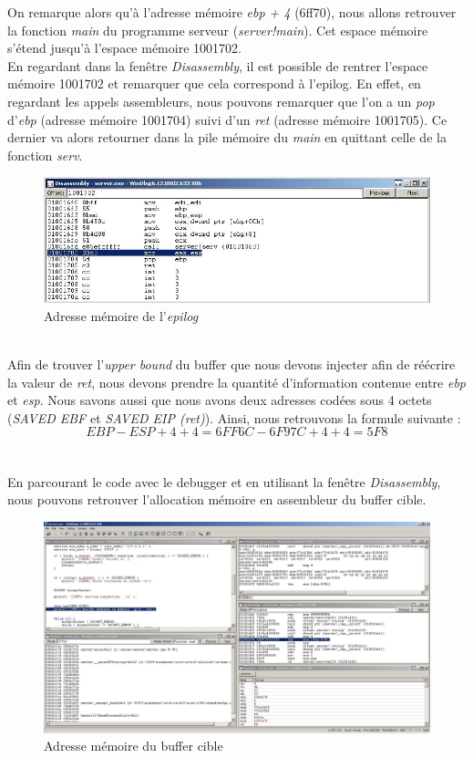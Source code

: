 On remarque alors qu'à l'adresse mémoire \textit{ebp + 4} (6ff70), nous allons retrouver la fonction \textit{main} du programme serveur (\textit{server!main}). Cet espace mémoire s'étend jusqu'à l'espace mémoire 1001702.\\
En regardant dans la fenêtre \textit{Disassembly}, il est possible de rentrer l'espace mémoire 1001702 et remarquer que cela correspond à l'epilog. En effet, en regardant les appels assembleurs, nous pouvons remarquer que l'on a un \textit{pop} d'\textit{ebp} (adresse mémoire 1001704) suivi d'un \textit{ret} (adresse mémoire 1001705). Ce dernier va alors retourner dans la pile mémoire du \textit{main} en quittant celle de la fonction \textit{serv}.
\begin{figure}[H]
 \centering
 \includegraphics[width=.9\textwidth]{img/44.JPG}
 \caption{Adresse mémoire de l'\textit{epilog}}
 \label{img:44}
\end{figure}
~\\
Afin de trouver l'\textit{upper bound} du buffer que nous devons injecter afin de réécrire la valeur de \textit{ret}, nous devons prendre la quantité d'information contenue entre \textit{ebp} et \textit{esp}. Nous savons aussi que nous avons deux adresses codées sous 4 octets (\textit{SAVED EBF} et \textit{SAVED EIP (ret)}). Ainsi, nous retrouvons la formule suivante :
\begin{displaymath}
 \textit{EBP}-\textit{ESP}+4+4=6FF6C-6F97C+4+4=5F8
\end{displaymath}
\\~\\
En parcourant le code avec le debugger et en utilisant la fenêtre \textit{Disassembly}, nous pouvons retrouver l'allocation mémoire en assembleur du buffer cible.
\begin{figure}[H]
 \centering
 \includegraphics[width=.9\textwidth]{img/46.JPG}
 \caption{Adresse mémoire du buffer cible}
 \label{img:46}
\end{figure}
